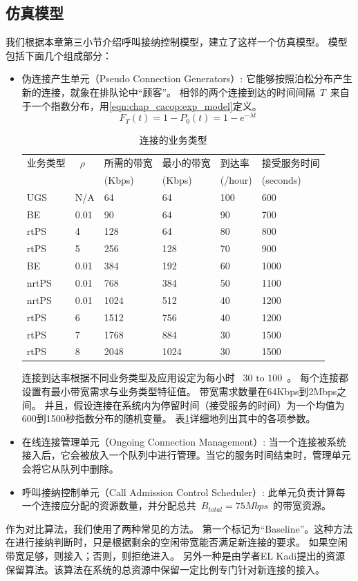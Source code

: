 \subsection{仿真模型}
我们根据本章第三小节介绍呼叫接纳控制模型，建立了这样一个仿真模型。
模型包括下面几个组成部分：
\begin{itemize}
\item 伪连接产生单元（Pseudo Connection Generators）: 它能够按照泊松分布产生新的连接，就象在排队论中“顾客”。
    相邻的两个连接到达的时间间隔~$T$~来自于一个指数分布，用\eqref{eqn:chap_cacop:exp_model}定义。
%
\begin{equation}
\label{eqn:chap_cacop:exp_model}
F_T(t) = 1 - P_0(t) = 1 - e^{-\lambda t}
\end{equation}
%
\begin{table}[tb]
\caption{连接的业务类型} \label{tb:chap_cacop:sim_cfg}
\begin{center}
\wuhao
\begin{tabularx}{0.99\linewidth}{XXXXXp{2.5cm}}
\toprule
业务类型 &~$\rho$~ &所需的带宽 & 最小的带宽 &到达率 &接受服务时间 \\
&&(Kbps)& (Kbps) & (/hour) &(seconds) \\
\midrule
UGS& N/A &64 &64 & 100 &600\\
BE & 0.01&90 &64 &90 &700\\
rtPS &4& 128 &64 &80 &800\\
rtPS &5& 256 &128 &70 &900\\
BE &0.01& 384 &192 &60 &1000\\
nrtPS &0.01& 768 &384 &50 &1100\\
nrtPS &0.01& 1024 &512 &40 &1200\\
rtPS &6& 1512 &756 &40 &1200\\
rtPS &7& 1768 &884 &30 &1500\\
rtPS &8& 2048 &1024 &30 &1500\\
\bottomrule
\end{tabularx}
\end{center}
\end{table}
连接到达率根据不同业务类型及应用设定为每小时 ~$30 \text{ to } 100 $~。
每个连接都设置有最小带宽需求与业务类型特征值。
带宽需求数量在64Kbps到2Mbps之间。
并且，假设连接在系统内为停留时间（接受服务的时间）为一个均值为600到1500秒指数分布的随机变量。
表\ref{tb:chap_cacop:sim_cfg}详细地列出其中的各项参数。

\item 在线连接管理单元（Ongoing Connection Management）: 当一个连接被系统接入后，它会被放入一个队列中进行管理。当它的服务时间结束时，管理单元会将它从队列中删除。

\item 呼叫接纳控制单元（Call Admission Control Scheduler）: 此单元负责计算每一个连接应分配的资源数量，并分配总共~$B_{total}=75Mbps$~的带宽资源。 
\end{itemize}
作为对比算法，我们使用了两种常见的方法。
第一个标记为“Baseline”。这种方法在进行接纳判断时，只是根据剩余的空闲带宽能否满足新连接的要求。
如果空闲带宽足够，则接入；否则，则拒绝进入。
另外一种是由学者EL Kadi提出的资源保留算法。该算法在系统的总资源中保留一定比例专门针对新连接的接入\cite{EL-Kadi2002}。
